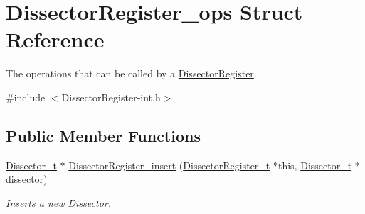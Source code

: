 \hypertarget{struct_dissector_register__ops}{}\section{Dissector\+Register\+\_\+ops Struct Reference}
\label{struct_dissector_register__ops}


The operations that can be called by a \hyperlink{struct_dissector_register}{Dissector\+Register}.  




{\ttfamily \#include $<$Dissector\+Register-\/int.\+h$>$}

\subsection*{Public Member Functions}
\begin{DoxyCompactItemize}
\item 
\hyperlink{struct_dissector}{Dissector\+\_\+t} $\ast$ \hyperlink{struct_dissector_register__ops_a8446d3a1c7fab1257da22cbede148d68}{Dissector\+Register\+\_\+insert} (\hyperlink{struct_dissector_register}{Dissector\+Register\+\_\+t} $\ast$this, \hyperlink{struct_dissector}{Dissector\+\_\+t} $\ast$dissector)
\begin{DoxyCompactList}\small\item\em Inserts a new \hyperlink{struct_dissector}{Dissector}. \end{DoxyCompactList}\end{DoxyCompactItemize}
